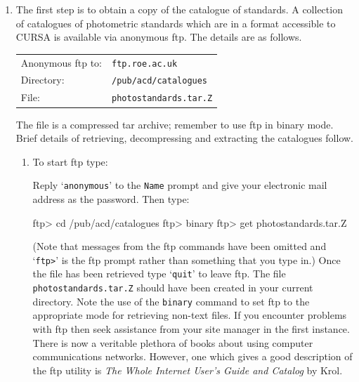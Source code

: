 \documentclass[twoside,11pt,nolof]{starlink}
\begin{document}
\begin{enumerate}

  \item The first step is to obtain a copy of the catalogue of
   standards.  A collection of catalogues of photometric standards
   which are in a format accessible to CURSA is available via anonymous
   ftp.  The details are as follows.

  \begin{tabular}{ll}
   Anonymous ftp to: & \texttt{ftp.roe.ac.uk}        \\
   Directory:        & \texttt{/pub/acd/catalogues}  \\
   File:             & \texttt{photostandards.tar.Z} \\
  \end{tabular}

   The file is a compressed tar archive; remember to use ftp in binary
   mode.  Brief details of retrieving, decompressing and extracting
   the catalogues follow.

  \begin{enumerate}

    \item To start ftp type:

\begin{terminalv}
\end{terminalv}

     Reply `\texttt{anonymous}' to the \texttt{Name} prompt and give your
     electronic mail address as the password.  Then type:

\begin{terminalv}
ftp>  cd /pub/acd/catalogues
ftp>  binary
ftp>  get photostandards.tar.Z
\end{terminalv}

     (Note that messages from the ftp commands have been omitted and
     `\verb-ftp>-' is the ftp prompt rather than something that you
     type in.)  Once the file has been retrieved type `\texttt{quit}' to
     leave ftp.  The file \texttt{photostandards.tar.Z} should have been
     created in your current directory.  Note the use of the \texttt{binary}
     command to set ftp to the appropriate mode for retrieving non-text
     files.  If you encounter problems with ftp then seek assistance from
     your site manager in the first instance.  There is now a veritable
     plethora of books about using computer communications networks.
     However, one which gives a good description of the ftp utility is
     \textit{The Whole Internet User's Guide and Catalog} by Krol\cite{KROL93}.


\end{enumerate}
\end{enumerate}
\end{document}
